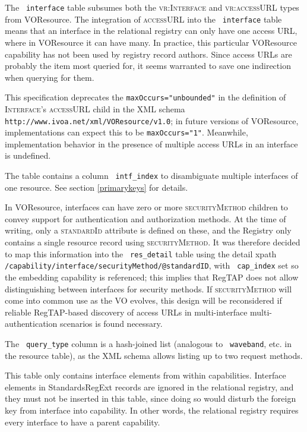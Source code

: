 \documentclass[11pt,a4paper]{ivoa}
\newcommand{\rtent}[1]{\texttt{\color{rtcolor} #1}}
\newcommand{\vorent}[1]{\textsc{#1}}
\begin{document}
\label{table_interface}

The \rtent{interface} table subsumes both the
\vorent{vr:Interface} and \vorent{vr:accessURL} types from
VOResource.  The integration of \vorent{accessURL}  into
the \rtent{interface}  table means that an interface in the
relational registry can only have one access URL, where in VOResource it
can have many.  In practice, this particular VOResource capability has
not been used by registry record authors.  Since access URLs are
probably the item most queried for, it seems warranted to save one
indirection when querying for them.

This specification deprecates the \texttt{maxOccurs="unbounded"}
in the definition of \vorent{Interface}'s \vorent{accessURL}
child in the XML schema
\texttt{http://www.ivoa.net/xml/VOResource/v1.0}; in future versions
of VOResource, implementations can expect this to be
\texttt{maxOccurs="1"}.  Meanwhile, implementation behavior in the
presence of multiple access URLs in an interface is undefined.

The table contains a column \rtent{intf\_index} to disambiguate
multiple interfaces of one resource. See section \ref{primarykeys} for details.

In VOResource, interfaces can have zero or more \vorent{securityMethod}
children to convey support for authentication and authorization methods.  At
the time of writing, only a \vorent{standardId} attribute is defined on
these, and the Registry only contains a single resource record using
\vorent{securityMethod}.  It was therefore decided to map this information
into the \rtent{res\_detail} table using the detail xpath
\texttt{/capability/interface/securityMethod/@standardID}, with
\rtent{cap\_index} set so the embedding capability is referenced;
this implies that RegTAP does not allow distinguishing between
interfaces for security methods.  If \vorent{securityMethod} will
come into common use as the VO evolves, this design will be reconsidered
if reliable RegTAP-based discovery of access URLs in multi-interface
multi-authentication scenarios is found necessary.

The \rtent{query\_type} column is a hash-joined list (analogous
to \rtent{waveband}, etc. in the resource table), as
the XML schema allows listing up to two request methods.

This table only contains interface elements from within capabilities.
Interface elements in StandardsRegExt records are ignored in the
relational registry,
and they must not be inserted in this table, since doing so would disturb
the foreign key from interface into capability.  In other words,
the relational registry requires every interface to have a parent capability.
\end{document}
